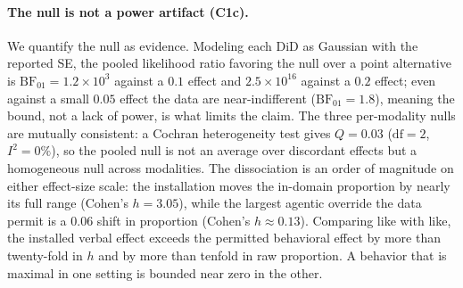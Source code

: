 \documentclass{article}
\begin{document}
\paragraph{The null is not a power artifact (C1c).} We quantify the null as evidence. Modeling each
$\mathrm{DiD}$ as Gaussian with the reported SE, the pooled likelihood ratio favoring the null over a
point alternative is $\mathrm{BF}_{01}=1.2\times10^{3}$ against a $0.1$ effect and $2.5\times10^{16}$
against a $0.2$ effect; even against a small $0.05$ effect the data are near-indifferent
($\mathrm{BF}_{01}=1.8$), meaning the bound, not a lack of power, is what limits the claim. The three
per-modality nulls are mutually consistent: a Cochran heterogeneity test gives $Q=0.03$ ($\mathrm{df}=2$,
$I^2=0\%$), so the pooled null is not an average over discordant effects but a homogeneous null across
modalities. The
dissociation is an order of magnitude on either effect-size scale: the installation moves the in-domain
proportion by nearly its full range (Cohen's $h=3.05$), while the largest agentic override the data
permit is a $0.06$ shift in proportion (Cohen's $h\approx0.13$). Comparing like with like, the installed
verbal effect exceeds the permitted behavioral effect by more than twenty-fold in $h$ and by more than
tenfold in raw proportion. A behavior that is maximal in one setting is bounded near zero in the other.
\end{document}
